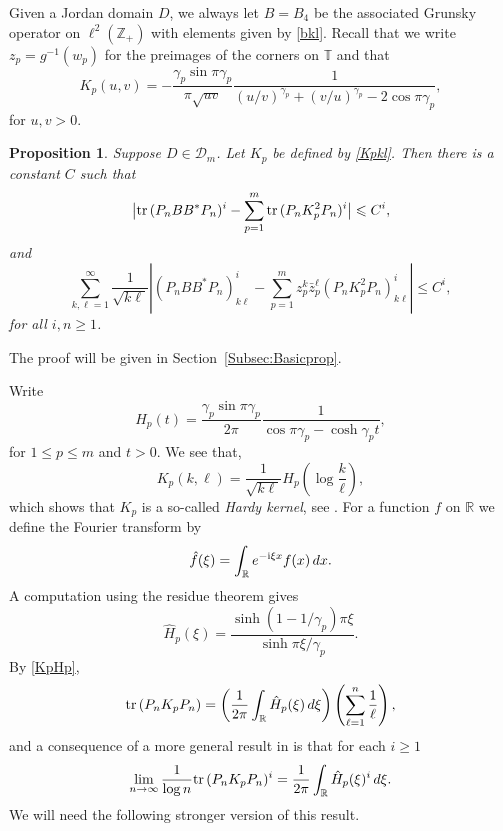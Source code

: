 \documentclass{article}
\numberwithin{equation}{section}
\numberwithin{figure}{section}
\theoremstyle{plain}
\theoremstyle{plain}
\numberwithin{thm}{section}
\newtheorem{proposition}[thm]{Proposition}
\theoremstyle{remark}
\newcommand{\Tr}{\text{{\rm tr\,}}}
\newcommand{\R}{\mathbb{R}}
\newcommand{\T}{\mathbb{T}}
\newcommand{\Z}{\mathbb{Z}}
\newcommand{\I}{{\rm i}}
\let \le \leqslant
\let \ge \geqslant
\begin{document}
 Given a Jordan domain $D$, we always let $B=B_4$ be the associated Grunsky operator on $\ell^2(\Z_+)$ with elements given by \eqref{bkl}. Recall that we write $z_p = g^{-1}(w_p)$ for the preimages of the corners on $\T$ and that   
\[
K_p(u,v)=-\frac{\gamma_p\sin\pi\gamma_p}{\pi\sqrt{uv}}\frac 1{(u/v)^{\gamma_p}+(v/u)^{\gamma_p}-2\cos\pi\gamma_p},
\]
 for $u,v>0$. 
\begin{proposition}\label{Prop:TrComp1}
Suppose $D\in\mathcal{D}_m$. Let $K_p$ be defined by \eqref{Kpkl}. Then there is a constant $C$ such that
\begin{equation}\label{TrComp1}
\bigl|\Tr(P_nBB^*P_n)^i-\sum_{p=1}^m\Tr(P_nK_p^2P_n)^i\bigr|\le C^i,
\end{equation}
and
\begin{equation*}\label{TrComp1:2}
    \sum_{k,\ell=1}^\infty \frac 1{\sqrt{k\ell}}|(P_nBB^*P_n)^i_{k\ell}-\sum_{p=1}^m z_p^k\bar{z}_p^\ell(P_nK_p^2P_n)^i_{k\ell}|\le C^i,
\end{equation*}
for all $i,n\ge 1$.
\end{proposition}

The proof will be given in Section~\ref{Subsec:Basicprop}.

Write
\begin{equation}\label{Hpt}
H_p(t)=\frac{\gamma_p\sin\pi\gamma_p}{2\pi}\frac 1{\cos\pi\gamma_p-\cosh\gamma_pt},
\end{equation}
for $1\le p\le m$ and $t>0$. 
We see that,
\begin{equation}\label{KpHp}
K_p(k,\ell)=\frac 1{\sqrt{k\ell}}H_p(\log\frac k{\ell}),
\end{equation}
which shows that $K_p$ is a so-called \emph{Hardy kernel}, see \cite{Pu}. For a function $f$ on $\R$ we define the Fourier transform by
\begin{equation}\label{FourTr}
\hat{f}(\xi)=\int_\R e^{- \I \xi x}f(x)\,dx.
\end{equation}
A computation using the residue theorem gives
\begin{equation}\label{HpFT}
\hat{H}_p(\xi)=\frac{\sinh(1-1/\gamma_p)\pi\xi}{\sinh\pi\xi/\gamma_p}.
\end{equation}
By \eqref{KpHp},
\[
\Tr(P_nK_pP_n) = \left( \frac 1{2\pi}\int_\R \hat{H}_p(\xi)\,d\xi \right) \left( \sum_{\ell=1}^n \frac{1}{\ell} \right),
\]
and a consequence of a more general result in \cite{Pu} is that for each $i\ge 1$
\begin{equation*}
\lim_{n\to\infty}\frac 1{\log n}\Tr(P_nK_pP_n)^i=\frac 1{2\pi}\int_\R \hat{H}_p(\xi)^i\,d\xi.
\end{equation*}
We will need the following stronger version of this result.
\end{document}
